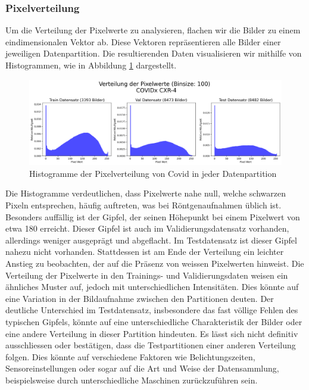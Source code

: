 
\subsubsection{Pixelverteilung} \label{chap:Pixelverteilung-TestProblemEda1-covidx}

Um die Verteilung der Pixelwerte zu analysieren, flachen wir die Bilder zu einem eindimensionalen Vektor ab. Diese Vektoren repräsentieren alle Bilder einer jeweiligen Datenpartition. Die resultierenden Daten visualisieren wir mithilfe von Histogrammen, wie in Abbildung \ref{fig:hist-datapartition-covid} dargestellt.

\begin{figure}[ht]
    \centering
    \includegraphics[width=\linewidth]{01-images/03-data/covid-Pixelverteilung-Partitionen.png}
    \caption{Histogramme der Pixelverteilung von Covid in jeder Datenpartition}
    \label{fig:hist-datapartition-covid}
\end{figure}

Die Histogramme verdeutlichen, dass Pixelwerte nahe null, welche schwarzen Pixeln entsprechen, häufig auftreten, was bei Röntgenaufnahmen üblich ist. Besonders auffällig ist der Gipfel, der seinen Höhepunkt bei einem Pixelwert von etwa 180 erreicht. Dieser Gipfel ist auch im Validierungsdatensatz vorhanden, allerdings weniger ausgeprägt und abgeflacht. Im Testdatensatz ist dieser Gipfel nahezu nicht vorhanden. Stattdessen ist am Ende der Verteilung ein leichter Anstieg zu beobachten, der auf die Präsenz von weissen Pixelwerten hinweist. Die Verteilung der Pixelwerte in den Trainings- und Validierungsdaten weisen ein ähnliches Muster auf, jedoch mit unterschiedlichen Intensitäten. Dies könnte auf eine Variation in der Bildaufnahme  zwischen den Partitionen deuten. Der deutliche Unterschied im Testdatensatz, insbesondere das fast völlige Fehlen des typischen Gipfels, könnte auf eine unterschiedliche Charakteristik der Bilder oder eine andere Verteilung in dieser Partition hindeuten. Es lässt sich nicht definitiv ausschliessen oder bestätigen, dass die Testpartitionen einer anderen Verteilung folgen. Dies könnte auf verschiedene Faktoren wie Belichtungszeiten, Sensoreinstellungen oder sogar auf die Art und Weise der Datensammlung, beispielsweise durch unterschiedliche Maschinen zurückzuführen sein.

